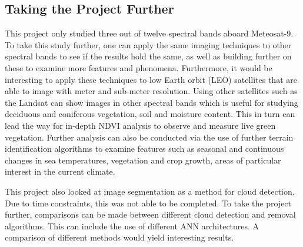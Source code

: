 \subsection{Taking the Project Further}

This project only studied three out of twelve spectral bands aboard Meteosat-9. To take this study further, one can apply the same imaging techniques to other spectral bands to see if the results hold the same, as well as building further on these to examine more features and phenomena. Furthermore, it would be interesting to apply these techniques to low Earth orbit (LEO) satellites that are able to image with meter and sub-meter resolution. Using other satellites such as the Landsat can show images in other spectral bands which is useful for studying deciduous and coniferous vegetation, soil and  moisture content. This in turn can lead the way for in-depth NDVI analysis to observe and measure live green vegetation. Further analysis can also be conducted via the use of further terrain identification algorithms to examine features such as seasonal and continuous changes in sea temperatures, vegetation and crop growth, areas of particular interest in the current climate.
\par
This project also looked at image segmentation as a method for cloud detection. Due to time constraints, this was not able to be completed. To take the project further, comparisons can be made between different cloud detection and removal algorithms. This can include the use of different ANN architectures. A comparison of different methods would yield interesting results.

